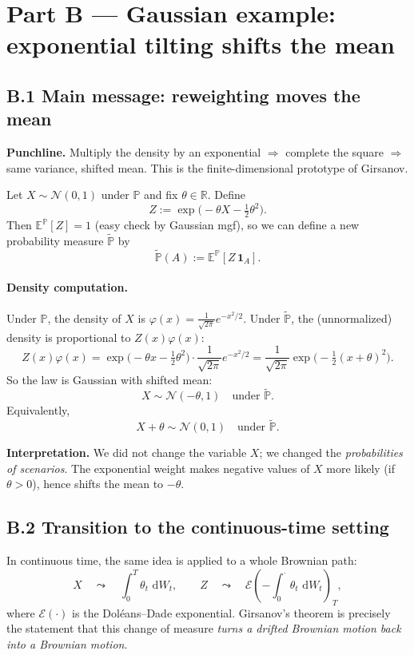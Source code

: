 \documentclass[11pt]{article}
\newcommand{\Pbb}{\mathbb{P}}
\newcommand{\E}{\mathbb{E}}
\newcommand{\R}{\mathbb{R}}
\newcommand{\dd}{\,\mathrm{d}}
\newcommand{\1}{\mathbf{1}}
\begin{document}
\section*{Part B --- Gaussian example: exponential tilting shifts the mean}

\subsection*{B.1 Main message: reweighting moves the mean}


\textbf{Punchline.} Multiply the density by an exponential $\Rightarrow$ complete the square
$\Rightarrow$ same variance, shifted mean.
This is the finite-dimensional prototype of Girsanov.


Let $X\sim\mathcal N(0,1)$ under $\Pbb$ and fix $\theta\in\R$.
Define
\[
Z:=\exp\!\Big(-\theta X-\tfrac12\theta^2\Big).
\]
Then $\E^{\Pbb}[Z]=1$ (easy check by Gaussian mgf), so we can define a new probability measure $\widetilde{\Pbb}$ by
\[
\widetilde{\Pbb}(A):=\E^{\Pbb}[Z\,\1_A].
\]

\paragraph{Density computation.}
Under $\Pbb$, the density of $X$ is $\varphi(x)=\frac{1}{\sqrt{2\pi}}e^{-x^2/2}$.
Under $\widetilde{\Pbb}$, the (unnormalized) density is proportional to $Z(x)\varphi(x)$:
\[
Z(x)\varphi(x)
=
\exp\!\Big(-\theta x-\tfrac12\theta^2\Big)\cdot \frac{1}{\sqrt{2\pi}}e^{-x^2/2}
=
\frac{1}{\sqrt{2\pi}}
\exp\!\Big(-\tfrac12(x+\theta)^2\Big).
\]
So the law is Gaussian with shifted mean:
\[
X \sim \mathcal N(-\theta,1)\quad\text{under }\widetilde{\Pbb}.
\]
Equivalently,
\[
X+\theta \sim \mathcal N(0,1)\quad\text{under }\widetilde{\Pbb}.
\]


\textbf{Interpretation.}
We did not change the variable $X$; we changed the \emph{probabilities of scenarios}.
The exponential weight makes negative values of $X$ more likely (if $\theta>0$),
hence shifts the mean to $-\theta$.


\subsection*{B.2 Transition to the continuous-time setting}
In continuous time, the same idea is applied to a whole Brownian path:
\[
X \quad\leadsto\quad \int_0^T \theta_t\,\dd W_t,
\qquad
Z \quad\leadsto\quad \mathcal E\!\left(-\int_0^\cdot \theta_t\,\dd W_t\right)_T,
\]
where $\mathcal E(\cdot)$ is the Dol\'eans--Dade exponential.
Girsanov's theorem is precisely the statement that this change of measure
\emph{turns a drifted Brownian motion back into a Brownian motion}.
\end{document}
